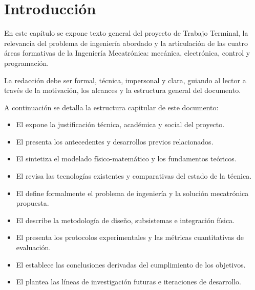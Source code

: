 
\chapter{Introducción}
\label{cap:introduccion}
En este capítulo se expone texto general del proyecto de Trabajo Terminal, la relevancia del problema de ingeniería abordado y la articulación de las cuatro áreas formativas de la Ingeniería Mecatrónica: mecánica, electrónica, control y programación.

La redacción debe ser formal, técnica, impersonal y clara, guiando al lector a través de la motivación, los alcances y la estructura general del documento.

A continuación se detalla la estructura capitular de este documento:
\begin{itemize}
    \item El  expone la justificación técnica, académica y social del proyecto.
    \item El  presenta los antecedentes y desarrollos previos relacionados.
    \item El  sintetiza el modelado físico-matemático y los fundamentos teóricos.
    \item El  revisa las tecnologías existentes y comparativas del estado de la técnica.
    \item El  define formalmente el problema de ingeniería y la solución mecatrónica propuesta.
    \item El  describe la metodología de diseño, subsistemas e integración física.
    \item El  presenta los protocolos experimentales y las métricas cuantitativas de evaluación.
    \item El  establece las conclusiones derivadas del cumplimiento de los objetivos.
    \ifTTII
    \item El  plantea las líneas de investigación futuras e iteraciones de desarrollo.
    \fi
\end{itemize}


